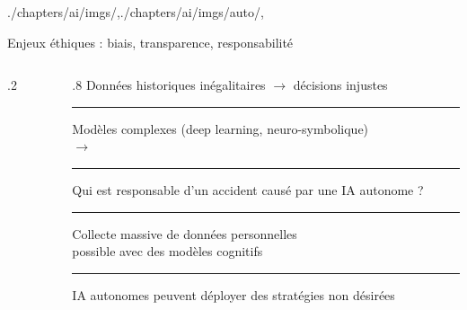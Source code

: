\begin{graphicspathcontext}{{./chapters/ai/imgs/},{./chapters/ai/imgs/auto/},\old}

\begin{frame}[t]{{Enjeux éthiques :} biais, transparence, responsabilité}
	\vspace{-.3cm}
	\begin{columns}[T]
		\begin{column}{.2\linewidth}
			\begin{bottomarrowsequence}[width=\linewidth]
			\end{bottomarrowsequence}
		\end{column}
		\begin{column}{.8\linewidth}
			Données historiques inégalitaires $\rightarrow$ décisions injustes \\
			\vspace{.2cm}
			\hrule
			\vspace{.3cm}
			Modèles complexes (deep learning, neuro-symbolique)  \\
			$\rightarrow$  %
			\vspace{.3cm}
			\hrule
			\vspace{.58cm}
			Qui est responsable d'un accident causé par une IA autonome ? %
			\vspace{.58cm}
			\hrule
			\vspace{.33cm}
			Collecte massive de données personnelles \\
			 possible avec des modèles cognitifs %
			\vspace{.33cm}
			\hrule
			\vspace{.6cm}
			IA autonomes peuvent déployer des stratégies non désirées %
		\end{column}
	\end{columns}
\end{frame}

\end{graphicspathcontext}

\endinput
